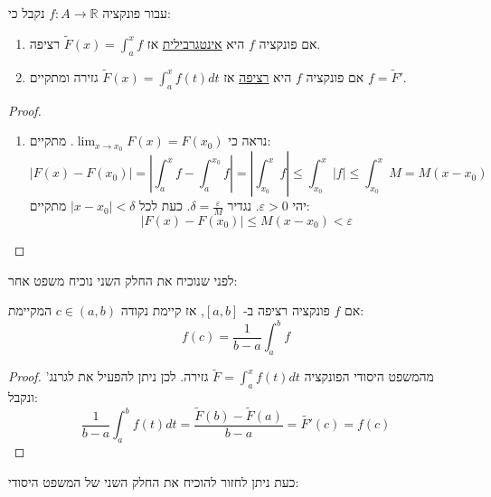 \documentclass{tstextbook}
\begin{document}
\begin{theorem}
עבור פונקציה \(f:A\to \mathbb{R}\) נקבל כי:

  \begin{enumerate}
    \item אם פונקציה \(f\) היא \underline{אינטגרבילית} אז \(\tilde F(x)=\int_a^x f\) רציפה. 


    \item אם פונקציה \(f\) היא \underline{רציפה} אז \(\tilde F(x)=\int_a^x f(t) dt\) גזירה ומתקיים \(f = \tilde F'\). 


  \end{enumerate}
\end{theorem}
\begin{proof}
  \begin{enumerate}
    \item נראה כי \(\lim_{x\to x_0} F(x) = F(x_0)\). מתקיים: 
$$            |F(x)-F(x_0)|=\left|\int_a^x f-\int_a^{x_0} f \right|=\left|\int_{x_0}^x f\right|\leq  \int_{x_0}^x |f| \leq \int_{x_0}^x M = M(x-x_0)
$$
יהי \(\varepsilon >0\). נגדיר \(\delta = \frac{\varepsilon}{M}\). כעת לכל \(|x-x_0|<\delta\) מתקיים:
$$|F(x)-F(x_0)|\leq M(x-x_0)<\varepsilon$$
  \end{enumerate}
\end{proof}
לפני שנוכיח את החלק השני נוכיח משפט אחר:

\begin{theorem}
אם \(f\) פונקציה רציפה ב- \([a,b]\), אז קיימת נקודה \(c\in (a,b)\) המקיימת: 
$$f(c)=\frac{1}{b-a}\int_a^b f$$

\end{theorem}
\begin{proof}
מהמשפט היסודי הפונקציה \(\tilde F=\int_a^x f(t) dt\) גזירה.
לכן ניתן להפעיל את לגרנג' ונקבל:
$$\frac{1}{b-a}\int_a^b f(t) dt = \frac{\tilde{F}(b)-\tilde{F}(a)}{b-a}=\tilde{F'}(c)=f(c)$$

\end{proof}
כעת ניתן לחזור להוכיח את החלק השני של המשפט היסודי:
\end{document}
